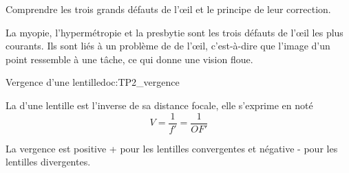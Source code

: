 \tetePremStssVisi
{}

\begin{objectifs}
  \item Comprendre les trois grands défauts de l'œil et le principe de leur correction.
\end{objectifs}

\begin{contexte}
  La myopie, l'hypermétropie et la presbytie sont les trois défauts de l'œil les plus courants.
  Ils sont liés à un problème de  de l'œil, c'est-à-dire que l'image d'un point ressemble à une tâche, ce qui donne une vision floue.
  
\end{contexte}

\begin{doc}{Vergence d'une lentille}{doc:TP2_vergence}
  \begin{importants}
    La  d'une lentille est l'inverse de sa distance focale, elle s'exprime en  noté \unit{\dioptre}
    \begin{equation*}  
      V = \dfrac{1}{f'} = \dfrac{1}{OF'}
    \end{equation*}
  \end{importants}

  La vergence est positive + pour les lentilles convergentes et négative - pour les lentilles divergentes.
\end{doc}

